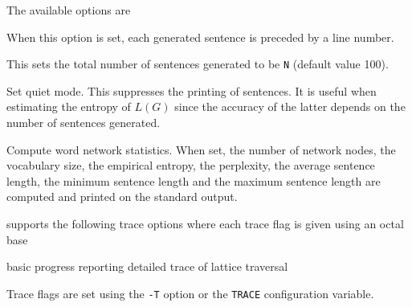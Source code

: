 The available options are

\begin{optlist}

   When this option is set, each generated sentence 
              is preceded by a line number.

    This sets the total number of sentences generated
              to be \texttt{N} (default value 100).

    Set quiet mode.  This suppresses the printing of sentences.
         It is useful when estimating the entropy of $L(G)$ since the
    accuracy of the latter depends on the number of sentences generated.

    Compute word network statistics.  When set, the number of
    network nodes, the vocabulary size, the empirical entropy, the
    perplexity, the average sentence length, the minimum sentence length
    and the maximum sentence length 
    are computed and printed on the standard output.
\end{optlist}


 supports the following trace options where each
trace flag is given using an octal base
\begin{optlist}
    basic progress reporting 
    detailed trace of lattice traversal
\end{optlist}
Trace flags are set using the \texttt{-T} option or the  \texttt{TRACE} 
configuration variable.


